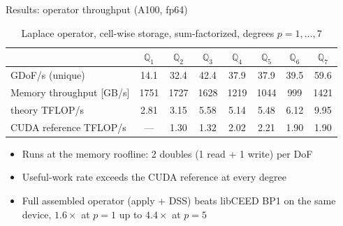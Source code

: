 \documentclass{beamer}
\begin{document}
\begin{frame}{Results: operator throughput (A100, fp64)}
    \begin{table}
        \centering
        \caption{Laplace operator, cell-wise storage, sum-factorized, degrees $p=1,\dots,7$}
        \footnotesize
        \begin{tabular}{l ccccccc}
            \toprule
                                                  & $\mathbb{Q}_1$ & $\mathbb{Q}_2$ & $\mathbb{Q}_3$ & $\mathbb{Q}_4$ & $\mathbb{Q}_5$ & $\mathbb{Q}_6$ & $\mathbb{Q}_7$ \\
            \midrule
            GDoF/s (unique)                       & 14.1           & 32.4           & 42.4           & 37.9           & 37.9           & 39.5           & 59.6           \\
            Memory throughput [GB/s]              & 1751           & 1727           & 1628           & 1219           & 1044           & 999            & 1421           \\
            \midrule
            theory TFLOP/s                        & \alert{2.81}   & \alert{3.15}   & \alert{5.58}   & \alert{5.14}   & \alert{5.48}   & \alert{6.12}   & \alert{9.95}   \\
            CUDA reference\footnotemark{} TFLOP/s & ---            & 1.30           & 1.32           & 2.02           & 2.21           & 1.90           & 1.90           \\
            \bottomrule
        \end{tabular}
    \end{table}
    \begin{itemize}
        \item Runs at the \alert{memory roofline}: 2 doubles (1 read + 1 write) per DoF
        \item Useful-work rate exceeds the CUDA reference \alert{at every degree}
        \item Full assembled operator (apply + DSS) beats \alert{libCEED BP1} on the same device, $1.6\times$ at $p=1$ up to
              $4.4\times$ at $p=5$
    \end{itemize}
\end{frame}
\end{document}

